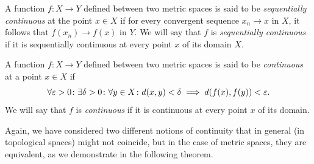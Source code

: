 \begin{definition}[continuity]%
  \label{def:continua_metrico}%
\mymark{**}%
A function $f\colon X \to Y$ defined between two metric spaces
is said to be \emph{sequentially continuous}%
 at the point $x\in X$ if
for every convergent sequence $x_n \to x$ in $X$, 
it follows that $f(x_n)\to f(x)$ in $Y$.
We will say that $f$ is \emph{sequentially continuous} if it is sequentially
continuous
at every point $x$ of its domain $X$.

A function $f\colon X \to Y$ defined between two metric spaces
is said to be \emph{continuous}%
 at a point $x\in X$ if
\begin{equation}\label{eq:continuita_metrico}
 \forall \varepsilon>0\colon \exists \delta>0\colon \forall y \in X \colon
 d(x,y)< \delta \implies d(f(x), f(y)) < \varepsilon.
\end{equation}
We will say that $f$ is \emph{continuous} if
it is continuous at every point $x$ of its domain.
\end{definition}

Again, we have considered two different notions of continuity that
in general (in topological spaces) might not coincide, but in the case of
metric spaces, they are equivalent, as we demonstrate in the following theorem.

